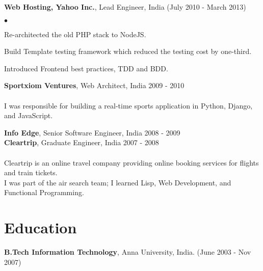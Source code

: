 \documentclass[margin, line, 10pt]{res}
\newenvironment{list2}{
  \begin{list}{$\bullet$}{%
      \setlength{\itemsep}{0in}
      \setlength{\parsep}{0in} \setlength{\parskip}{0in}
      \setlength{\topsep}{0in} \setlength{\partopsep}{0in}
      \setlength{\leftmargin}{0.2in}}}{\end{list}}
\begin{document}
\begin{resume}
{\Large {\bf Web Hosting, Yahoo Inc.}}, Lead Engineer, India  \hfill (July 2010 - March 2013)\\
\begin{list2}
\vspace{-.2cm}
\item Re-architected the old PHP stack to NodeJS.\\
\vspace{-.3cm}
\item Build Template testing framework which reduced the testing cost by one-third.\\
\vspace{-.3cm}
\item Introduced Frontend best practices, TDD and BDD.\\
\end{list2}
\vspace{.05cm}

{\Large {\bf Sportxiom Ventures}}, Web Architect, India  \hfill 2009 - 2010\\
\vspace{-.1cm}\\
I was responsible for building a real-time sports application in Python, Django,
and JavaScript.\\
\vspace{.05cm}

{\Large {\bf Info Edge}}, Senior Software Engineer, India \hfill 2008 - 2009 \\

{\Large {\bf Cleartrip}}, Graduate Engineer, India \hfill 2007 - 2008\\
\vspace{-.3cm}\\
Cleartrip is an online travel company providing online booking services for flights and train tickets.\\
I was part of the air search team; I learned Lisp, Web Development,
and Functional Programming.
\vspace{.05cm}

\section{Education}
{\bf B.Tech Information Technology}, Anna University, India. \hfill (June 2003 - Nov 2007)


\end{resume}
\end{document}
